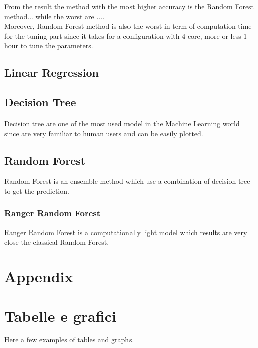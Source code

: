 \documentclass{FR16}
\begin{document}
From the result the method with the most higher accuracy is the Random Forest method... while the worst are ....
\\Moreover, Random Forest method is also the worst in term of computation time for the tuning part since it takes for a configuration with 4 core, more or less 1 hour to tune the parameters. 

\subsection{Linear Regression}


\subsection{Decision Tree}
Decision  tree are one of the most used model in the Machine Learning world since are very familiar to human users and can be easily plotted. 
\\



\subsection{Random Forest}
Random Forest is an ensemble method which use a combination of decision tree to get the prediction.
\subsubsection{Ranger Random Forest}
Ranger Random Forest is a computationally light model which results are very close the classical Random Forest.
\\





\newpage
\section{Appendix}


\noinden
\newpage

\section{Tabelle e grafici}
Here a few examples of tables and graphs.
\end{document}
